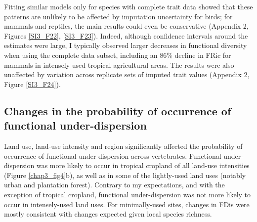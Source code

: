 Fitting similar models only for species with complete trait data showed that these patterns are unlikely to be affected by imputation uncertainty for birds; for mammals and reptiles, the main results could even be conservative (Appendix 2, Figures \ref{SI3_F22}, \ref{SI3_F23}). Indeed, although confidence intervals around the estimates were large, I typically observed larger decreases in functional diversity when using the complete data subset, including an 86\% decline in FRic for mammals in intensely used tropical agricultural areas. The results were also unaffected by variation across replicate sets of imputed trait values (Appendix 2, Figure \ref{SI3_F24}).


\subsection{Changes in the probability of occurrence of functional under-dispersion}

Land use, land-use intensity and region significantly affected the probability of occurrence of functional under-dispersion across vertebrates. Functional under-dispersion was more likely to occur in tropical cropland of all land-use intensities (Figure \ref{chap3_fig4}b), as well as in some of the lightly-used land uses (notably urban and plantation forest). Contrary to my expectations, and with the exception of tropical cropland, functional under-dispersion was not more likely to occur in intensely-used land uses. For minimally-used sites, changes in FDis were mostly consistent with changes expected given local species richness.

